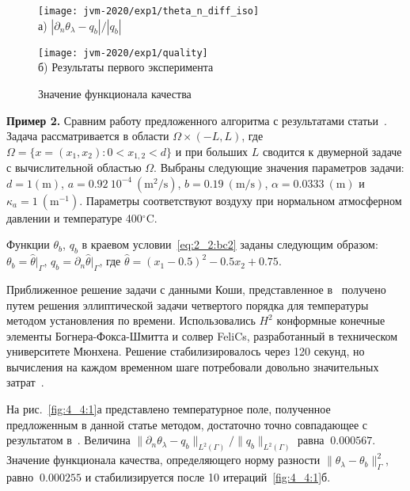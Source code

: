\begin{figure}[h!t]
    \begin{minipage}[b][][b]{0.49\linewidth}
        \centering
        \texttt{[image: jvm-2020/exp1/theta\_n\_diff\_iso]}
        \\ а) $|\partial_n\theta_\lambda-q_b|/|q_b|$
    \end{minipage}
    \hfill
    \begin{minipage}[b][][b]{0.49\linewidth}
        \centering
        \texttt{[image: jvm-2020/exp1/quality]}
        \\ б) Результаты первого эксперимента
    \end{minipage}
    \caption{Значение функционала качества}
    \label{fig:4_4:0}
\end{figure}

\textbf{Пример 2.}
Сравним работу предложенного алгоритма с результатами статьи~\cite{Chebotarev2019Problem}.
Задача рассматривается в области $\Omega \times (-L,L)$,
где $\Omega = \{ x = (x_1,x_2) \colon 0 < x_{1,2} < d\}$
и при больших $L$ сводится к двумерной задаче с вычислительной областью $\Omega$.
Выбраны следующие значения параметров задачи:
$d = \mathrm{1(m)}$, $a = 0.92~10^{-4}~\mathrm{(m^2/s)}$, $b= 0.19~\mathrm{(m/s)}$,
$\alpha = 0.0333~\mathrm{(m)}$ и $\kappa_a = 1~\mathrm{(m^{-1})}$.
Параметры соответствуют воздуху при нормальном атмосферном давлении и температуре 400$^\circ$C\@.

Функции $\theta_b$, $q_b$ в краевом условии~\eqref{eq:2_2:bc2} заданы следующим образом:
$\theta_b = \widehat{\theta}|_{\Gamma}$, $q_b = \partial_n \widehat{\theta}|_{\Gamma}$, где
$\widehat{\theta} = (x_1-0.5)^2 - 0.5x_2+0.75$.

Приближенное решение задачи с данными Коши, представленное в~\cite{Chebotarev2019Problem}
получено путем решения эллиптической задачи четвертого
порядка для температуры методом установления по времени.
Использовались $H^2$ конформные конечные элементы Богнера-Фокса-Шмитта и
солвер FeliCs, разработанный в техническом университете Мюнхена.
Решение стабилизировалось через 120 секунд, но вычисления на каждом временном
шаге потребовали довольно значительных затрат~\cite{Chebotarev2019Problem}.

На рис.~\ref{fig:4_4:1}а представлено температурное поле, полученное
предложенным в данной статье методом, достаточно
точно совпадающее с результатом в~\cite{Chebotarev2019Problem}.
Величина $\|\partial_n\theta_\lambda-q_b\|_{L^2(\Gamma)}/\|q_b\|_{L^2(\Gamma)}$ равна $~0.000567$.
Значение функционала качества, определяющего норму разности $\|\theta_\lambda -\theta_b\|^2_\Gamma$,
равно $~0.000255$ и стабилизируется после 10 итераций~\ref{fig:4_4:1}б.


